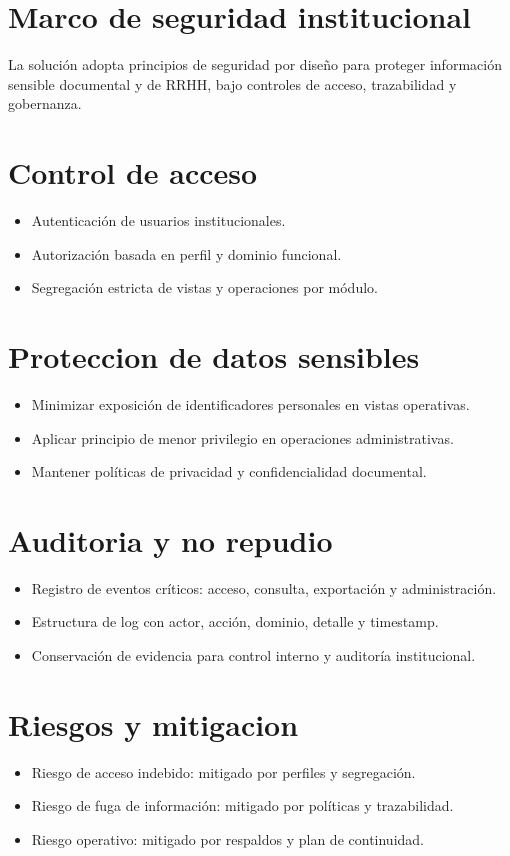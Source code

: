 \section{Marco de seguridad institucional}
La solución adopta principios de seguridad por diseño para proteger información sensible documental y de RRHH, bajo controles de acceso, trazabilidad y gobernanza.

\section{Control de acceso}
\begin{itemize}
  \item Autenticación de usuarios institucionales.
  \item Autorización basada en perfil y dominio funcional.
  \item Segregación estricta de vistas y operaciones por módulo.
\end{itemize}

\section{Proteccion de datos sensibles}
\begin{itemize}
  \item Minimizar exposición de identificadores personales en vistas operativas.
  \item Aplicar principio de menor privilegio en operaciones administrativas.
  \item Mantener políticas de privacidad y confidencialidad documental.
\end{itemize}

\section{Auditoria y no repudio}
\begin{itemize}
  \item Registro de eventos críticos: acceso, consulta, exportación y administración.
  \item Estructura de log con actor, acción, dominio, detalle y timestamp.
  \item Conservación de evidencia para control interno y auditoría institucional.
\end{itemize}

\section{Riesgos y mitigacion}
\begin{itemize}
  \item Riesgo de acceso indebido: mitigado por perfiles y segregación.
  \item Riesgo de fuga de información: mitigado por políticas y trazabilidad.
  \item Riesgo operativo: mitigado por respaldos y plan de continuidad.
\end{itemize}
